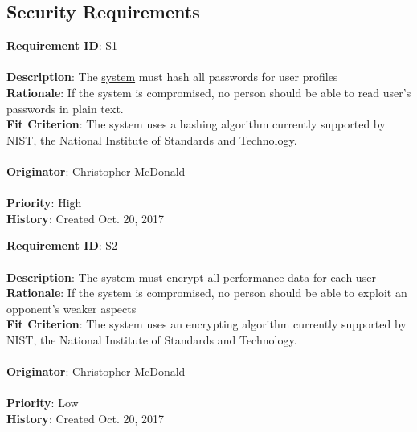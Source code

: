 \documentclass[11pt]{article}
\begin{document}
\subsection{Security Requirements}
\begin{framed}
	\noindent\textbf{Requirement ID}: S1 \hfill\\\\
	\noindent\textbf{Description}: The \hyperref[sec:definitions]{system} must hash all passwords for user profiles \\
	\textbf{Rationale}: If the system is compromised, no person should be able to read user's passwords in plain text. \\
	\textbf{Fit Criterion}: The system uses a hashing algorithm currently supported by NIST, the National Institute of Standards and Technology.\\\\
	\textbf{Originator}: Christopher McDonald \\\\
	\textbf{Priority}: High \hfill \\
	\noindent\textbf{History}: Created Oct. 20, 2017
\end{framed}

\begin{framed}
	\noindent\textbf{Requirement ID}: S2 \hfill\\\\
	\noindent\textbf{Description}: The \hyperref[sec:definitions]{system} must encrypt all performance data for each user \\
	\textbf{Rationale}: If the system is compromised, no person should be able to exploit an opponent's weaker aspects \\
	\textbf{Fit Criterion}: The system uses an encrypting algorithm currently supported by NIST, the National Institute of Standards and Technology.\\\\
	\textbf{Originator}: Christopher McDonald \\\\
	\textbf{Priority}: Low \hfill \\
	\noindent\textbf{History}: Created Oct. 20, 2017
\end{framed}
\end{document}
